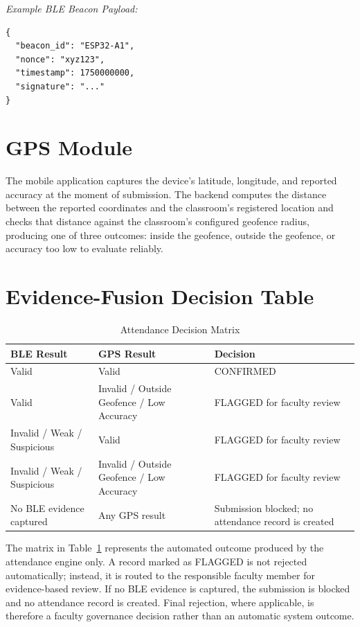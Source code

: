 \documentclass[12pt, a4paper, oneside]{report}
\begin{document}
\textit{Example BLE Beacon Payload:}

\begin{lstlisting}
{
  "beacon_id": "ESP32-A1",
  "nonce": "xyz123",
  "timestamp": 1750000000,
  "signature": "..."
}
\end{lstlisting}

\section{GPS Module}

The mobile application captures the device's latitude, longitude, and reported accuracy at the moment of submission. The backend computes the distance between the reported coordinates and the classroom's registered location and checks that distance against the classroom's configured geofence radius, producing one of three outcomes: inside the geofence, outside the geofence, or accuracy too low to evaluate reliably.

\section{Evidence-Fusion Decision Table}

\begin{table}[htbp]
\centering
\caption{Attendance Decision Matrix}
\label{tab:decision-matrix}
\begin{tabularx}{\textwidth}{|l|l|X|}
\hline
\textbf{BLE Result} & \textbf{GPS Result} & \textbf{Decision} \\
\hline
Valid & Valid & CONFIRMED \\
\hline
Valid & Invalid / Outside Geofence / Low Accuracy & FLAGGED for faculty review \\
\hline
Invalid / Weak / Suspicious & Valid & FLAGGED for faculty review \\
\hline
Invalid / Weak / Suspicious & Invalid / Outside Geofence / Low Accuracy & FLAGGED for faculty review \\
\hline
No BLE evidence captured & Any GPS result & Submission blocked; no attendance record is created \\
\hline
\end{tabularx}
\end{table}

The matrix in Table~\ref{tab:decision-matrix} represents the automated outcome produced by the attendance engine only. A record marked as FLAGGED is not rejected automatically; instead, it is routed to the responsible faculty member for evidence-based review. If no BLE evidence is captured, the submission is blocked and no attendance record is created. Final rejection, where applicable, is therefore a faculty governance decision rather than an automatic system outcome.
\end{document}
